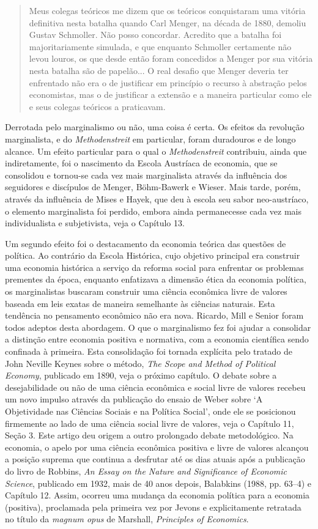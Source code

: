 \documentclass[12pt]{article}
\begin{document}
\begin{quote}
Meus colegas teóricos me dizem que os teóricos conquistaram uma vitória definitiva nesta batalha quando Carl Menger, na década de 1880, demoliu Gustav Schmoller. Não posso concordar. Acredito que a batalha foi majoritariamente simulada, e que enquanto Schmoller certamente não levou louros, os que desde então foram concedidos a Menger por sua vitória nesta batalha são de papelão... O real desafio que Menger deveria ter enfrentado não era o de justificar em princípio o recurso à abstração pelos economistas, mas o de justificar a extensão e a maneira particular como ele e seus colegas teóricos a praticavam.
\end{quote}

Derrotada pelo marginalismo ou não, uma coisa é certa. Os efeitos da revolução marginalista, e do \textit{Methodenstreit} em particular, foram duradouros e de longo alcance. Um efeito particular para o qual o \textit{Methodenstreit} contribuiu, ainda que indiretamente, foi o nascimento da Escola Austríaca de economia, que se consolidou e tornou-se cada vez mais marginalista através da influência dos seguidores e discípulos de Menger, Böhm-Bawerk e Wieser. Mais tarde, porém, através da influência de Mises e Hayek, que deu à escola seu sabor neo-austríaco, o elemento marginalista foi perdido, embora ainda permanecesse cada vez mais individualista e subjetivista, veja o Capítulo 13.

Um segundo efeito foi o destacamento da economia teórica das questões de política. Ao contrário da Escola Histórica, cujo objetivo principal era construir uma economia histórica a serviço da reforma social para enfrentar os problemas prementes da época, enquanto enfatizava a dimensão ética da economia política, os marginalistas buscaram construir uma ciência econômica livre de valores baseada em leis exatas de maneira semelhante às ciências naturais. Esta tendência no pensamento econômico não era nova. Ricardo, Mill e Senior foram todos adeptos desta abordagem. O que o marginalismo fez foi ajudar a consolidar a distinção entre economia positiva e normativa, com a economia científica sendo confinada à primeira. Esta consolidação foi tornada explícita pelo tratado de John Neville Keynes sobre o método, \textit{The Scope and Method of Political Economy}, publicado em 1890, veja o próximo capítulo. O debate sobre a desejabilidade ou não de uma ciência econômica e social livre de valores recebeu um novo impulso através da publicação do ensaio de Weber sobre ‘A Objetividade nas Ciências Sociais e na Política Social’, onde ele se posicionou firmemente ao lado de uma ciência social livre de valores, veja o Capítulo 11, Seção 3. Este artigo deu origem a outro prolongado debate metodológico. Na economia, o apelo por uma ciência econômica positiva e livre de valores alcançou a posição suprema que continua a desfrutar até os dias atuais após a publicação do livro de Robbins, \textit{An Essay on the Nature and Significance of Economic Science}, publicado em 1932, mais de 40 anos depois, Balabkins (1988, pp. 63–4) e Capítulo 12. Assim, ocorreu uma mudança da economia política para a economia (positiva), proclamada pela primeira vez por Jevons e explicitamente retratada no título da \textit{magnum opus} de Marshall, \textit{Principles of Economics}.
\end{document}
